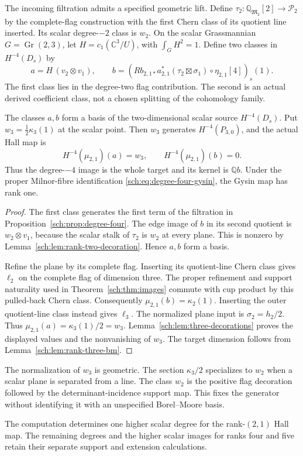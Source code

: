 The incoming filtration admits a specified geometric lift.
Define $\tau_2:\mathbb Q_{\mathfrak M_2}[2]\to\mathcal P_2$
by the complete-flag construction with the first Chern class of
its quotient line inserted. Its scalar degree-$-2$ class is $w_2$.
On the scalar Grassmannian $G=\operatorname{Gr}(2,3)$, let
$H=c_1(\mathbb C^3/U)$, with $\int_G H^2=1$.
Define two classes in $H^{-4}(D_s)$ by
\[
 a=H\,(v_2\otimes v_1),\qquad
 b=\left(Rb_{2,1*}a_{2,1}^*(\tau_2\boxtimes\sigma_1)
                    \circ\eta_{2,1}[4]\right)_s(1).
\]
The first class lies in the degree-two flag contribution. The second
is an actual derived coefficient class, not a chosen splitting of
the cohomology family.

\begin{theorem}
\label{sch:thm:degree-four-image}
The classes $a,b$ form a basis of the two-dimensional scalar source
$H^{-4}(D_s)$. Put $w_3=\frac12\kappa_3(1)$ at the scalar point.
Then $w_3$ generates $H^{-4}(P_{3,0})$, and the actual Hall map is
\[
 H^{-4}(\mu_{2,1})(a)=w_3,
 \qquad H^{-4}(\mu_{2,1})(b)=0.
\]
Thus the degree-$-4$ image is the whole target and its kernel is
$\mathbb Q b$. Under the proper Milnor-fibre identification
\eqref{sch:eq:degree-four-gysin}, the Gysin map has rank one.
\end{theorem}

\begin{proof}
The first class generates the first term of the filtration in
Proposition~\ref{sch:prop:degree-four}.
The edge image of $b$ in its second quotient is $w_2\otimes v_1$,
because the scalar stalk of $\tau_2$ is $w_2$ at every plane.
This is nonzero by Lemma~\ref{sch:lem:rank-two-decoration}.
Hence $a,b$ form a basis.

Refine the plane by its complete flag. Inserting its quotient-line
Chern class gives $\ell_2$ on the complete flag of dimension three.
The proper refinement and support naturality used in
Theorem~\ref{sch:thm:images} commute with cup product by this
pulled-back Chern class. Consequently
$\mu_{2,1}(b)=\kappa_2(1)$.
Inserting the outer quotient-line class instead gives $\ell_3$.
The normalized plane input is $\sigma_2=h_2/2$.
Thus $\mu_{2,1}(a)=\kappa_3(1)/2=w_3$.
Lemma~\ref{sch:lem:three-decorations} proves the displayed values
and the nonvanishing of $w_3$.
The target dimension follows from
Lemma~\ref{sch:lem:rank-three-bm}.
\end{proof}

The normalization of $w_3$ is geometric. The section
$\kappa_3/2$ specializes to $w_2$ when a scalar plane is separated
from a line. The class $w_2$ is the positive flag decoration followed
by the determinant-incidence support map. This fixes the generator
without identifying it with an unspecified Borel--Moore basis.

The computation determines one higher scalar degree for the
rank-$(2,1)$ Hall map. The remaining degrees and the higher scalar
images for ranks four and five retain their separate support and
extension calculations.
